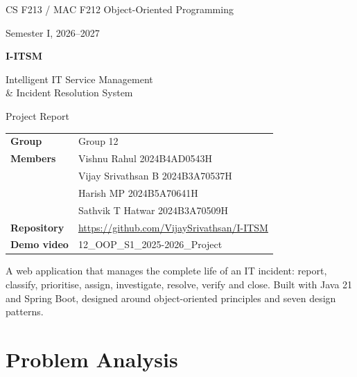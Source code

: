 \documentclass[11pt,a4paper]{article}
\newcommand{\groupno}{12}
\newcommand{\repourl}{https://github.com/VijaySrivathsan/I-ITSM}
\newcommand{\videoname}{\groupno\_OOP\_S1\_2025-2026\_Project}
\begin{document}
\begin{titlepage}
\thispagestyle{empty}
\vspace*{2.2cm}
{\headingfont\color{muted}\large CS F213 / MAC F212 Object-Oriented Programming\par}
{\headingfont\color{muted}\large Semester I, 2026--2027\par}
\vspace{1.6cm}
{\headingfont\bfseries\color{brand}\fontsize{34}{40}\selectfont I-ITSM\par}
\vspace{0.4cm}
{\headingfont\color{brand2}\LARGE Intelligent IT Service Management\\[0.2em] \& Incident Resolution System\par}
\vspace{0.8cm}
{\Large Project Report\par}
\vspace{1.8cm}
{\large
\begin{tabular}{@{}L{3.6cm}L{10cm}@{}}
\textbf{Group} & Group \groupno \\
\textbf{Members} & Vishnu Rahul \hfill 2024B4AD0543H \\
 & Vijay Srivathsan B \hfill 2024B3A70537H \\
 & Harish MP \hfill 2024B5A70641H \\
 & Sathvik T Hatwar \hfill 2024B3A70509H \\
\textbf{Repository} & \url{\repourl} \\
\textbf{Demo video} & \videoname \\
\end{tabular}\par}
\vfill
{\color{muted}A web application that manages the complete life of an IT incident: report, classify, prioritise, assign, investigate, resolve, verify and close. Built with Java 21 and Spring Boot, designed around object-oriented principles and seven design patterns.\par}
\end{titlepage}

\setcounter{tocdepth}{1}
\tableofcontents
\clearpage

\section{Problem Analysis}
\end{document}
